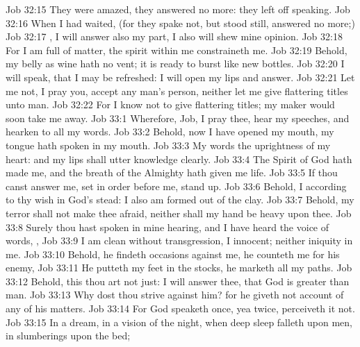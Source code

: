 \vs Job 32:15 They were amazed, they answered no more: they left off speaking.
\vs Job 32:16 When I had waited, (for they spake not, but stood still,  answered no more;)
\vs Job 32:17 , I will answer also my part, I also will shew mine opinion.
\vs Job 32:18 For I am full of matter, the spirit within me constraineth me.
\vs Job 32:19 Behold, my belly  as wine  hath no vent; it is ready to burst like new bottles.
\vs Job 32:20 I will speak, that I may be refreshed: I will open my lips and answer.
\vs Job 32:21 Let me not, I pray you, accept any man's person, neither let me give flattering titles unto man.
\vs Job 32:22 For I know not to give flattering titles;  my maker would soon take me away.
\vs Job 33:1 Wherefore, Job, I pray thee, hear my speeches, and hearken to all my words.
\vs Job 33:2 Behold, now I have opened my mouth, my tongue hath spoken in my mouth.
\vs Job 33:3 My words  the uprightness of my heart: and my lips shall utter knowledge clearly.
\vs Job 33:4 The Spirit of God hath made me, and the breath of the Almighty hath given me life.
\vs Job 33:5 If thou canst answer me, set  in order before me, stand up.
\vs Job 33:6 Behold, I  according to thy wish in God's stead: I also am formed out of the clay.
\vs Job 33:7 Behold, my terror shall not make thee afraid, neither shall my hand be heavy upon thee.
\vs Job 33:8 Surely thou hast spoken in mine hearing, and I have heard the voice of  words, ,
\vs Job 33:9 I am clean without transgression, I  innocent; neither  iniquity in me.
\vs Job 33:10 Behold, he findeth occasions against me, he counteth me for his enemy,
\vs Job 33:11 He putteth my feet in the stocks, he marketh all my paths.
\vs Job 33:12 Behold,  this thou art not just: I will answer thee, that God is greater than man.
\vs Job 33:13 Why dost thou strive against him? for he giveth not account of any of his matters.
\vs Job 33:14 For God speaketh once, yea twice,  perceiveth it not.
\vs Job 33:15 In a dream, in a vision of the night, when deep sleep falleth upon men, in slumberings upon the bed;
